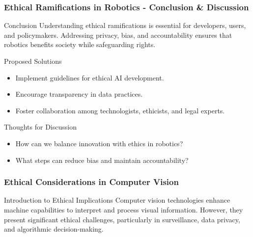 \documentclass[aspectratio=169]{beamer}
\begin{document}
\begin{frame}[fragile]
    \frametitle{Ethical Ramifications in Robotics - Conclusion & Discussion}
    \begin{block}{Conclusion}
        Understanding ethical ramifications is essential for developers, users, and policymakers. Addressing privacy, bias, and accountability ensures that robotics benefits society while safeguarding rights.
    \end{block}
    
    \begin{block}{Proposed Solutions}
        \begin{itemize}
            \item Implement guidelines for ethical AI development.
            \item Encourage transparency in data practices.
            \item Foster collaboration among technologists, ethicists, and legal experts.
        \end{itemize}
    \end{block}

    \begin{block}{Thoughts for Discussion}
        \begin{itemize}
            \item How can we balance innovation with ethics in robotics?
            \item What steps can reduce bias and maintain accountability?
        \end{itemize}
    \end{block}
\end{frame}

\begin{frame}[fragile]
    \frametitle{Ethical Considerations in Computer Vision}
    \begin{block}{Introduction to Ethical Implications}
        Computer vision technologies enhance machine capabilities to interpret and process visual information. 
        However, they present significant ethical challenges, particularly in surveillance, data privacy, and algorithmic decision-making.
    \end{block}
\end{frame}
\end{document}
